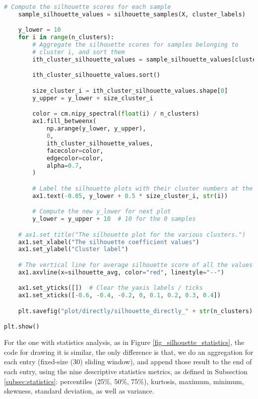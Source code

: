\begin{lstlisting}[language=Python]
    # Compute the silhouette scores for each sample
    sample_silhouette_values = silhouette_samples(X, cluster_labels)

    y_lower = 10
    for i in range(n_clusters):
        # Aggregate the silhouette scores for samples belonging to
        # cluster i, and sort them
        ith_cluster_silhouette_values = sample_silhouette_values[cluster_labels == i]

        ith_cluster_silhouette_values.sort()

        size_cluster_i = ith_cluster_silhouette_values.shape[0]
        y_upper = y_lower + size_cluster_i

        color = cm.nipy_spectral(float(i) / n_clusters)
        ax1.fill_betweenx(
            np.arange(y_lower, y_upper),
            0,
            ith_cluster_silhouette_values,
            facecolor=color,
            edgecolor=color,
            alpha=0.7,
        )

        # Label the silhouette plots with their cluster numbers at the middle
        ax1.text(-0.05, y_lower + 0.5 * size_cluster_i, str(i))

        # Compute the new y_lower for next plot
        y_lower = y_upper + 10  # 10 for the 0 samples

    # ax1.set_title("The silhouette plot for the various clusters.")
    ax1.set_xlabel("The silhouette coefficient values")
    ax1.set_ylabel("Cluster label")

    # The vertical line for average silhouette score of all the values
    ax1.axvline(x=silhouette_avg, color="red", linestyle="--")

    ax1.set_yticks([])  # Clear the yaxis labels / ticks
    ax1.set_xticks([-0.6, -0.4, -0.2, 0, 0.1, 0.2, 0.3, 0.4])

    plt.savefig("plot/directly/silhouette_directly_" + str(n_clusters) + ".pdf", format="pdf", bbox_inches="tight")

plt.show()
\end{lstlisting}

For the one with statistics analysis, as in Figure \ref{fig_silhouette_statistics}, the code for drawing it is similar, the only difference is that, we do an aggregation for each entry (fixed-size (30) sliding window), and append those result to the end of each entry, using the nine descriptive statistics metrics, as defined in Subsection \ref{subsec:statistics}: percentiles (25\%, 50\%, 75\%), kurtosis, maximum, minimum, skewness, standard deviation, as well as variance.
